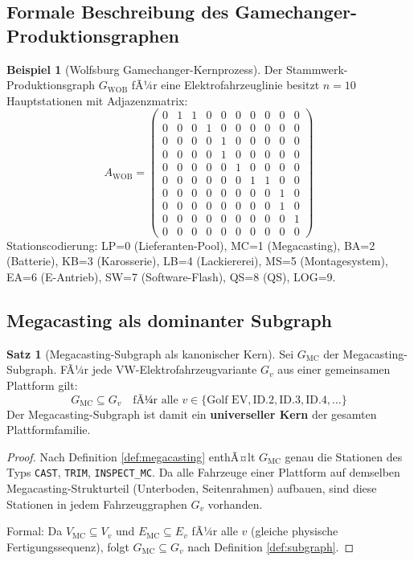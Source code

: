 ﻿\documentclass[a4paper,12pt]{article}
\theoremstyle{definition}
\newtheorem{beispiel}{Beispiel}
\newtheorem{satz}{Satz}
\begin{document}
\subsection{Formale Beschreibung des Gamechanger-Produktionsgraphen}

\begin{beispiel}[Wolfsburg Gamechanger-Kernprozess]
\label{bsp:wolfsburg}
Der Stammwerk-Produktionsgraph $G_{\mathrm{WOB}}$ fÃ¼r eine Elektrofahrzeuglinie besitzt
$n = 10$ Hauptstationen mit Adjazenzmatrix:
\[
A_{\mathrm{WOB}} = \begin{pmatrix}
0 & 1 & 1 & 0 & 0 & 0 & 0 & 0 & 0 & 0 \\
0 & 0 & 0 & 1 & 0 & 0 & 0 & 0 & 0 & 0 \\
0 & 0 & 0 & 0 & 1 & 0 & 0 & 0 & 0 & 0 \\
0 & 0 & 0 & 0 & 1 & 0 & 0 & 0 & 0 & 0 \\
0 & 0 & 0 & 0 & 0 & 1 & 0 & 0 & 0 & 0 \\
0 & 0 & 0 & 0 & 0 & 0 & 1 & 1 & 0 & 0 \\
0 & 0 & 0 & 0 & 0 & 0 & 0 & 0 & 1 & 0 \\
0 & 0 & 0 & 0 & 0 & 0 & 0 & 0 & 1 & 0 \\
0 & 0 & 0 & 0 & 0 & 0 & 0 & 0 & 0 & 1 \\
0 & 0 & 0 & 0 & 0 & 0 & 0 & 0 & 0 & 0
\end{pmatrix}
\]
Stationscodierung: LP=0 (Lieferanten-Pool), MC=1 (Megacasting), BA=2 (Batterie), KB=3 (Karosserie),
LB=4 (Lackiererei), MS=5 (Montagesystem), EA=6 (E-Antrieb), SW=7 (Software-Flash), QS=8 (QS), LOG=9.
\end{beispiel}

\subsection{Megacasting als dominanter Subgraph}

\begin{satz}[Megacasting-Subgraph als kanonischer Kern]
\label{satz:megacasting_kern}
Sei $G_{\mathrm{MC}}$ der Megacasting-Subgraph. FÃ¼r jede VW-Elektrofahrzeugvariante
$G_v$ aus einer gemeinsamen Plattform gilt:
\[
G_{\mathrm{MC}} \subseteq G_v \quad \text{fÃ¼r alle } v \in \{\text{Golf EV}, \text{ID.2}, \text{ID.3}, \text{ID.4}, \ldots\}
\]
Der Megacasting-Subgraph ist damit ein \textbf{universeller Kern} der gesamten Plattformfamilie.
\end{satz}

\begin{proof}
Nach Definition \ref{def:megacasting} enthÃ¤lt $G_{\mathrm{MC}}$ genau die Stationen des Typs
\texttt{CAST}, \texttt{TRIM}, \texttt{INSPECT\_MC}. Da alle Fahrzeuge einer Plattform
auf demselben Megacasting-Strukturteil (Unterboden, Seitenrahmen) aufbauen, sind diese
Stationen in jedem Fahrzeuggraphen $G_v$ vorhanden.

Formal: Da $V_{\mathrm{MC}} \subseteq V_v$ und $E_{\mathrm{MC}} \subseteq E_v$ fÃ¼r alle
$v$ (gleiche physische Fertigungssequenz), folgt $G_{\mathrm{MC}} \subseteq G_v$
nach Definition \ref{def:subgraph}.
\end{proof}
\end{document}
